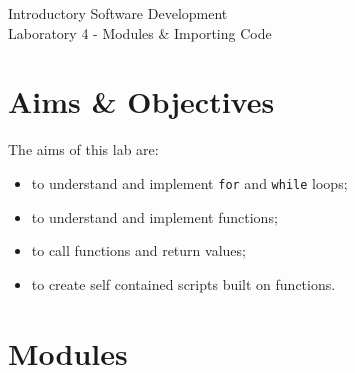 \documentclass[12pt,oneside]{cttutorial}
\begin{document}
\tutorialextra{}


 

\newcommand{\alert}[1]
{\marginpar
  {\makebox[0 pt][l]
    {\texttt{[image: ../../Figures/png/warning.png]}
  }
  \parbox{2 cm}{{\sffamily \bfseries \tiny #1}}}}


\renewcommand{\baselinestretch}{1.5}
\textwidth=15cm

\newcommand{\I}{j}

\begin{center}
\begin{bfseries}
Introductory Software Development\\Laboratory 4 - Modules \& Importing Code
\end{bfseries}
\end{center}

\section{Aims \& Objectives}

The aims of this lab are:

\begin{itemize}
\item to understand and implement \lstinline!for! and \lstinline!while! loops;
\item to understand and implement functions;
\item to call functions and return values;
\item to create self contained scripts built on functions.
\end{itemize}

\section{Modules}
\end{document}
